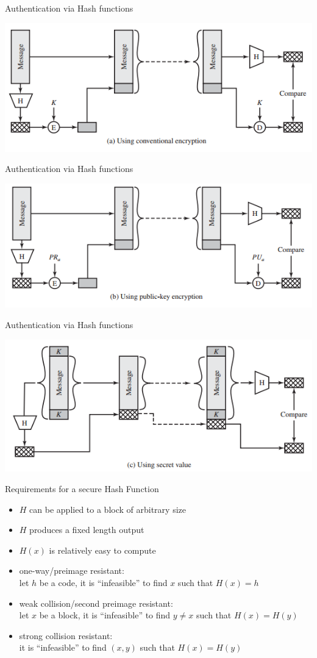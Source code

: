 \documentclass{beamer}
\begin{document}
\begin{frame}{Authentication via Hash functions}
  \begin{center}
    \includegraphics[width=0.7\linewidth]{AuthHASH1}
  \end{center}
\end{frame}
\begin{frame}{Authentication via Hash functions}
  \begin{center}
    \includegraphics[width=0.7\linewidth]{AuthHASH2}
  \end{center}
\end{frame}
\begin{frame}{Authentication via Hash functions}
  \begin{center}
    \includegraphics[width=0.7\linewidth]{AuthHASH3}
  \end{center}
\end{frame}

\begin{frame}{Requirements for a secure Hash Function}
  \begin{itemize}
  \item $H$ can be applied to a block of arbitrary size
  \item $H$ produces a fixed length output
  \item $H(x)$ is relatively easy to compute
  \item one-way/preimage resistant:\\
    let $h$ be a code, it is ``infeasible'' to find $x$
    such that $H(x)=h$
  \item weak collision/second preimage resistant:\\
    let $x$ be a block, it is ``infeasible'' to find $y \neq x$
    such that $H(x)=H(y)$
  \item strong  collision resistant:\\
    it is ``infeasible'' to find $(x,y)$ such that $H(x)=H(y)$
  \end{itemize}
\end{frame}
\end{document}
